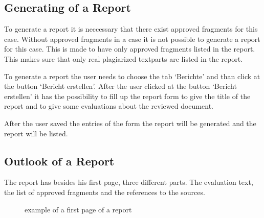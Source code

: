 \subsection{Generating of a Report}

To generate a report it is neccessary that there exist approved fragments for this case. Without approved fragments in a case it is not possible to generate a report for this case. 
This is made to have only approved fragments listed in the report. This makes sure that only real plagiarized textparts are listed in the report.

To generate a report the user needs to choose the tab `Berichte' and than click at the button `Bericht erstellen'. After the user clicked at the  button `Bericht erstellen' it has the possibility to fill up the report form to give the title of the report and to give some evaluations about the reviewed document.

After the user saved the entries of the form the report will be generated and the report will be listed.

\subsection{Outlook of a Report}

The report has besides his first page, three different parts. The evaluation text, the list of approved fragments and the references to the sources.

\begin{figure}[!h]
  \centering
  \caption{example of a first page of a report}
  \label{fig:report_deckblatt}
\end{figure}

